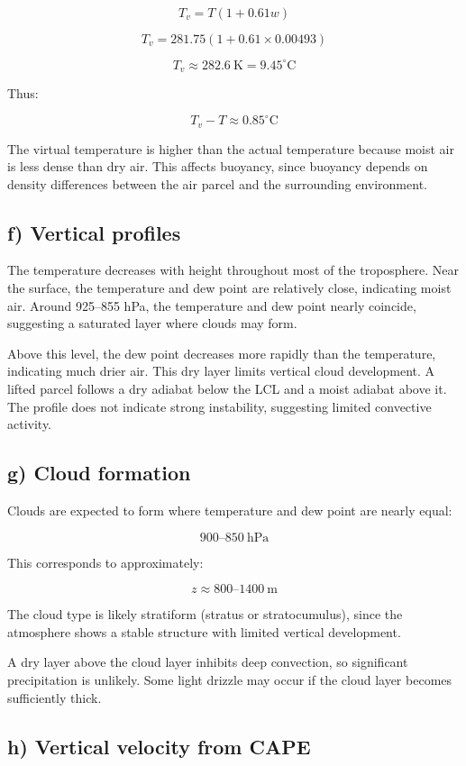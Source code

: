 \documentclass{article}
\begin{document}
\[
T_v = T (1 + 0.61 w)
\]

\[
T_v = 281.75 (1 + 0.61 \times 0.00493)
\]

\[
T_v \approx 282.6 \ \text{K} = 9.45^\circ\text{C}
\]

Thus:

\[
T_v - T \approx 0.85^\circ\text{C}
\]

The virtual temperature is higher than the actual temperature because moist air is less dense than dry air. This affects buoyancy, since buoyancy depends on density differences between the air parcel and the surrounding environment.

\subsection*{f) Vertical profiles}

The temperature decreases with height throughout most of the troposphere. Near the surface, the temperature and dew point are relatively close, indicating moist air. Around 925--855 hPa, the temperature and dew point nearly coincide, suggesting a saturated layer where clouds may form.

Above this level, the dew point decreases more rapidly than the temperature, indicating much drier air. This dry layer limits vertical cloud development. A lifted parcel follows a dry adiabat below the LCL and a moist adiabat above it. The profile does not indicate strong instability, suggesting limited convective activity.

\subsection*{g) Cloud formation}

Clouds are expected to form where temperature and dew point are nearly equal:

\[
900 \text{--} 850 \ \text{hPa}
\]

This corresponds to approximately:

\[
z \approx 800 \text{--} 1400 \ \text{m}
\]

The cloud type is likely stratiform (stratus or stratocumulus), since the atmosphere shows a stable structure with limited vertical development.

A dry layer above the cloud layer inhibits deep convection, so significant precipitation is unlikely. Some light drizzle may occur if the cloud layer becomes sufficiently thick.

\subsection*{h) Vertical velocity from CAPE}
\end{document}

